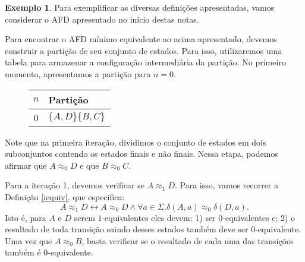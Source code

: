 \documentclass[a4paper]{article}
\theoremstyle{definition}
\newtheorem{Example}{Exemplo}
\begin{document}
  \begin{Example}
    Para exemplificar as diversas definições apresentadas, vamos considerar o
    AFD apresentado no início destas notas.
    \begin{figure}[H]
      \centering
    \end{figure}

    Para encontrar o AFD mínimo equivalente ao acima apresentado, devemos
    construir a partição de seu conjunto de estados. Para isso, utilizaremos
    uma tabela para armazenar a configuração intermediária da partição.
    No primeiro momento, apresentamos a partição para $n = 0$.
    \begin{figure}[H]
      \begin{tabular}{|c|l|}
        \hline
        $n$ & Partição \\ \hline
        0   & $\{A,D\}\{B,C\}$ \\\hline
      \end{tabular}
      \centering
    \end{figure}
    Note que na primeira iteração, dividimos o conjunto de estados em dois
    subconjuntos contendo os estados finais e não finais. Nessa etapa,
    podemos afirmar que $A \approx_0 D$ e que $B\approx_0 C$.

    Para a iteração 1, devemos verificar se $A \approx_1 D$. Para isso, vamos
    recorrer a Definição \ref{iequiv}, que especifica:
    \[
      A \approx_1 D \leftrightarrow A\approx_0 D \land \forall a \in \Sigma.
      \delta(A,a) \approx_0 \delta(D,a).
    \]
    Isto é, para $A$ e $D$ serem $1$-equivalentes eles devem: 1) ser
    0-equivalentes e; 2) o resultado de toda transição saindo desses estados
    também deve ser 0-equivalente. Uma vez que $A \approx_0 B$, basta verificar
    se o resultado de cada uma das transições também é 0-equivalente.


\end{Example}
\end{document}
